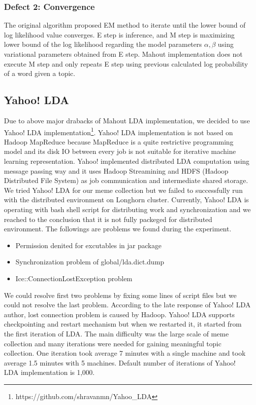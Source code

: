 \documentclass{sig-alternate}
\begin{document}
\subsubsection{Defect 2: Convergence}
The original algorithm proposed EM method to iterate until the lower bound of log likelihood value converges. E step is inference, and M step is maximizing lower bound of the log likelihood regarding the model parameters $\alpha, \beta$ using variational parameters obtained from E step. Mahout implementation does not execute M step and only repeats E step using previous calculated log probability of a word given a topic.

\subsection{Yahoo! LDA}
Due to above major drabacks of Mahout LDA implementation, we decided to use Yahoo! LDA implementation\footnote{https://github.com/shravanmn/Yahoo\_LDA}. Yahoo! LDA implementation is not based on Hadoop MapReduce because MapReduce is a quite restrictive programming model and its disk IO between every job is not suitable for iterative machine learning representation. Yahoo! implemented distributed LDA computation using message passing way and it uses Hadoop Streamining and HDFS (Hadoop Distributed File System) as job communication and intermediate shared storage. We tried Yahoo! LDA for our meme collection but we failed to successfully run with the distributed environment on Longhorn cluster. Currently, Yahoo! LDA is operating with bash shell script for distributing work and synchronization and we reached to the conclusion that it is not fully packeged for distributed environment. The followings are problems we found during the experiment.
\begin{itemize}
 \item Permission denited for excutables in jar package
 \item Synchronization problem of global/lda.dict.dump
 \item Ice::ConnectionLostException problem 
\end{itemize}
We could resolve first two problems by fixing some lines of script files but we could not resolve the last problem. According to the late response of Yahoo! LDA author, lost connection problem is caused by Hadoop. Yahoo! LDA supports checkpointing and restart mechanism but when we restarted it, it started from the first iteration of LDA. The main difficulty was the large scale of meme collection and many iterations were needed for gaining meaningful topic collection. One iteration took average 7 minutes with a single machine and took average 1.5 minutes with 5 machines. Default number of iterations of Yahoo! LDA implementation is 1,000.
\end{document}

